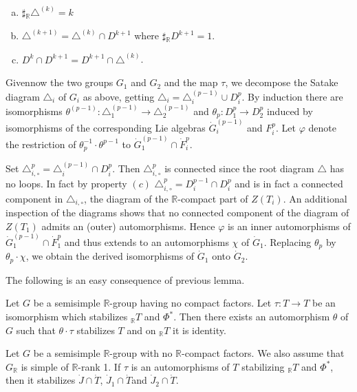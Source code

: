 \begin{enumerate}[(a)]
\item $\sharp {}_\mathbb{R} \triangle^{(k)}=k$
  \item $\triangle^{(k+1)}= \triangle^{(k)} \cap D^{k+1}$ where
    $\sharp {}_\mathbb{R} D^{k+1}=1$.
    \item $D^{k} \cap D^{k+1} = D^{k+1} \cap \triangle^{(k)}$.
\end{enumerate}

Given\pageoriginale now the two groups $G_1$ and $G_2$ and the map
$\tau$, we decompose the Satake diagram $\triangle_i$ of $G_i$ as
above, getting $\triangle_i = \triangle_i^{(p-1)} \cup D^p_i$. By
induction there are isomorphisms $\theta^{(p-1)}: \triangle_1^{(p-1)}
\to \triangle_2^{(p-1)}$ and $\theta_p : D_1^p \to D^p_2$ induced by
isomorphisms of the corresponding Lie algebras $\dot{G}_i^{(p-1)}$ and
$F_i^p$. Let $\varphi$ denote the restriction of $\theta_p^{-1} \cdot
\theta^{p-1}$ to $\dot{G}_1^{(p-1)} \cap \dot{F}_i^p$.

Set $\triangle^p_{i, \circ}= \triangle_i^{(p-1)} \cap D^p_i$. Then
$\triangle_{i, \circ}^p$ is connected since the root diagram
$\triangle$ has no loops. In fact by property $(c)$ $\triangle^p_{i,
  \circ}= D^{p-1}_i \cap D^p_i$ and is in fact a connected component
in $\triangle_{i, \circ}$, the diagram of the $\mathbb{R}$-compact
part of $Z(T_i)$. An additional inspection of the diagrams shows that
no connected component of the diagram of $Z(T_1)$ admits an (outer)
automorphisms. Hence $\varphi$ is an inner automorphisms of
$\dot{G}_1^{(p-1)} \cap \dot{F}^p_1$ and thus extends to an
automorphisms $\chi$ of  $\dot{G}_1$. Replacing $\theta_p$ by
$\theta_p \cdot \chi$, we obtain the derived isomorphisms of
$\dot{G}_1$ onto $\dot{G}_2$.

The following is an easy consequence of previous lemma.

\begin{thm} \label{chap6:thm6.5}
  Let $G$ be a semisimple $\mathbb{R}$-group having no compact
  factors. Let $\tau: T \to T$ be an isomorphism which stabilizes
  ${}_\mathbb{R} T$ and $\Phi^*$. Then there exists an automorphism
  $\theta$ of $G$ such that $\theta \cdot \tau$ stabilizes $T$ and on
  ${}_\mathbb{R} T$ it is identity. 
\end{thm}

\begin{lemma} \label{chap6:lem6.6}
  Let $G$ be a semisimple $\mathbb{R}$-group with no
  $\mathbb{R}$-compact factors. We also assume that $G_\mathbb{R}$ is
  simple of $\mathbb{R}$-rank 1. If $\tau$ is an automorphisms of $T$
  stabilizing ${}_\mathbb{R} T$ and $\Phi^*$, then it stabilizes
  $\dot{J} \cap \dot{T}$, $\dot{J}_1 \cap \dot{T}$\pageoriginale and
  $\dot{J}_2 \cap \dot{T}$.
\end{lemma}

